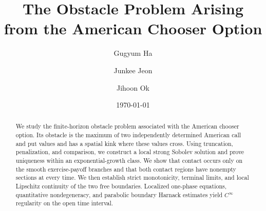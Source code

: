 \documentclass[11pt, a4paper, leqno]{amsart}
\date{\today}
\numberwithin{equation}{section}
\theoremstyle{plain}
\theoremstyle{definition}
\theoremstyle{remark}
\begin{document}
\title[The Obstacle Problem Arising from the American Chooser Option]{The Obstacle Problem Arising from the American Chooser Option}


\author{Gugyum Ha}
\address{Gugyum Ha, Department of Mathematics, Sogang University, Seoul 04107, Republic of Korea}

\author{Junkee Jeon}
\address{Junkee Jeon, Department of  Applied Mathematics, Kyung Hee University, Yongin-Si 17104, Republic of Korea}

\author{Jihoon Ok}
\address{Jihoon Ok, Department of Mathematics, Sogang University, Seoul 04107, Republic of Korea}




\begin{abstract}
{
We study the finite-horizon obstacle problem associated with the American
chooser option. Its obstacle is the maximum of two independently determined
American call and put values and has a spatial kink where these values
cross. Using truncation, penalization, and comparison, we construct a local
strong Sobolev solution and prove uniqueness within an exponential-growth
class. We show that contact occurs only on the smooth exercise-payoff
branches and that both contact regions have nonempty sections at every
time. We then establish strict monotonicity, terminal limits, and local
Lipschitz continuity of the two free boundaries. Localized one-phase
equations, quantitative nondegeneracy, and parabolic boundary Harnack
estimates yield $C^\infty$ regularity on the open time interval.
}
\end{abstract}

\maketitle
\end{document}
